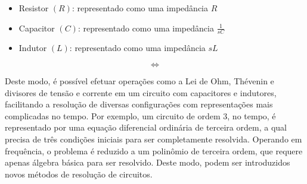 \documentclass{article}
\numberwithin{equation}{section}
\newlength\Colsep
\let\dfr\dfrac
\begin{document}
\begin{itemize}
    \item Resistor $(R)$: representado como uma impedância $R$
    \item Capacitor $(C)$: representado como uma impedância $\displaystyle{\frac{1}{sC}}$
    \item Indutor $(L)$: representado como uma impedância $sL$
\end{itemize}
%
\noindent\begin{minipage}{\textwidth}
\centering
\begin{minipage}[c][5cm][c]{\dimexpr0.45\textwidth-0.5\Colsep\relax}
    \begin{center}
    \end{center}
\end{minipage} \hfill
\begin{minipage}[c][5cm][c]{\dimexpr0.1\textwidth-0.5\Colsep\relax}
    $$\iff$$
\end{minipage} \hfill
\begin{minipage}[c][5cm][c]{\dimexpr0.45\textwidth-0.5\Colsep\relax}
    \begin{center}
    \end{center}
\end{minipage}
\end{minipage}

Deste modo, é possível efetuar operações como a Lei de Ohm, Thévenin e divisores de tensão e corrente em um circuito com capacitores e indutores, facilitando a resolução de diversas configurações com representações mais complicadas no tempo. Por exemplo, um circuito de ordem 3, no tempo, é representado por uma equação diferencial ordinária de terceira ordem, a qual precisa de três condições iniciais para ser completamente resolvida. Operando em frequência, o problema é reduzido a um polinômio de terceira ordem, que requere apenas álgebra básica para ser resolvido. Deste modo, podem ser introduzidos novos métodos de resolução de circuitos.
\end{document}

